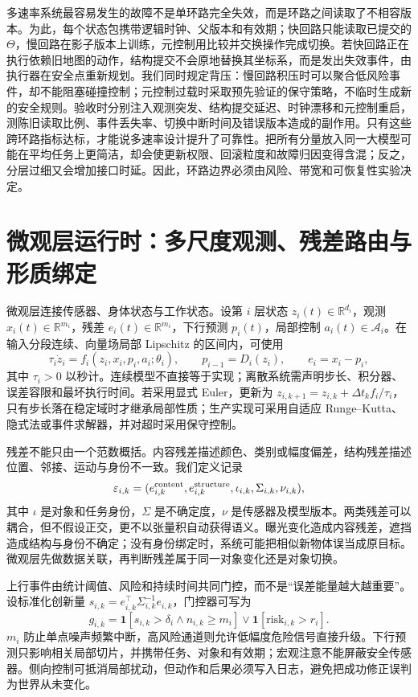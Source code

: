 多速率系统最容易发生的故障不是单环路完全失效，而是环路之间读取了不相容版本。为此，每个状态包携带逻辑时钟、父版本和有效期；快回路只能读取已提交的 $\Theta$，慢回路在影子版本上训练，元控制用比较并交换操作完成切换。若快回路正在执行依赖旧地图的动作，结构提交不会原地替换其坐标系，而是发出失效事件，由执行器在安全点重新规划。我们同时规定背压：慢回路积压时可以聚合低风险事件，却不能阻塞碰撞控制；元控制过载时采取预先验证的保守策略，不临时生成新的安全规则。验收时分别注入观测突发、结构提交延迟、时钟漂移和元控制重启，测陈旧读取比例、事件丢失率、切换中断时间及错误版本造成的副作用。只有这些跨环路指标达标，才能说多速率设计提升了可靠性。把所有分量放入同一大模型可能在平均任务上更简洁，却会使更新权限、回滚粒度和故障归因变得含混；反之，分层过细又会增加接口时延。因此，环路边界必须由风险、带宽和可恢复性实验决定。

\section{微观层运行时：多尺度观测、残差路由与形质绑定}
\label{sec:micro_runtime_ode}

微观层连接传感器、身体状态与工作状态。设第 $i$ 层状态 $z_i(t)\in\mathbb R^{d_i}$，观测 $x_i(t)\in\mathbb R^{m_i}$，残差 $e_i(t)\in\mathbb R^{m_i}$，下行预测 $p_i(t)$，局部控制 $a_i(t)\in\mathcal A_i$。在输入分段连续、向量场局部 Lipschitz 的区间内，可使用
\[
\tau_i\dot z_i=f_i(z_i,x_i,p_i,a_i;\theta_i),\qquad p_{i-1}=D_i(z_i),\qquad e_i=x_i-p_i,
\]
其中 $\tau_i>0$ 以秒计。连续模型不直接等于实现；离散系统需声明步长、积分器、误差容限和最坏执行时间。若采用显式 Euler，更新为 $z_{i,k+1}=z_{i,k}+\Delta t_k f_i/\tau_i$，只有步长落在稳定域时才继承局部性质；生产实现可采用自适应 Runge--Kutta、隐式法或事件求解器，并对超时采用保守控制。

残差不能只由一个范数概括。内容残差描述颜色、类别或幅度偏差，结构残差描述位置、邻接、运动与身份不一致。我们定义记录
\[
\varepsilon_{i,k}=(e^{\rm content}_{i,k},e^{\rm structure}_{i,k},\iota_{i,k},\Sigma_{i,k},\nu_{i,k}),
\]
其中 $\iota$ 是对象和任务身份，$\Sigma$ 是不确定度，$\nu$ 是传感器及模型版本。两类残差可以耦合，但不假设正交，更不以张量积自动获得语义。曝光变化造成内容残差，遮挡造成结构与身份不确定；没有身份绑定时，系统可能把相似新物体误当成原目标。微观层先做数据关联，再判断残差属于同一对象变化还是对象切换。

上行事件由统计阈值、风险和持续时间共同门控，而不是“误差能量越大越重要”。设标准化创新量 $s_{i,k}=e_{i,k}^{\top}\Sigma_{i,k}^{-1}e_{i,k}$，门控器可写为
\[
g_{i,k}=\mathbf 1[s_{i,k}>\delta_i\land n_{i,k}\ge m_i]\lor\mathbf 1[\mathrm{risk}_{i,k}>r_i].
\]
$m_i$ 防止单点噪声频繁中断，高风险通道则允许低幅度危险信号直接升级。下行预测只影响相关局部切片，并携带任务、对象和有效期；宏观注意不能屏蔽安全传感器。侧向控制可抵消局部扰动，但动作和后果必须写入日志，避免把成功修正误判为世界从未变化。

